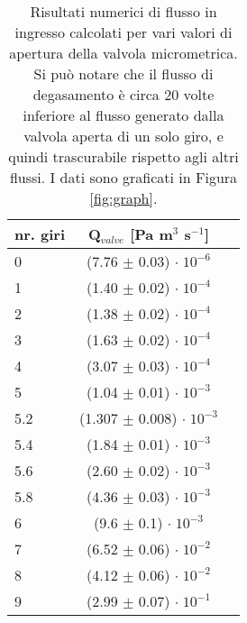 \begin{SCtable}[0.6][b!]
	\begin{tabular}{ l c c }
        \toprule
        nr. giri & Q$_{valve}$ [Pa m$^3$ s$^{-1}$] \\ 
        \midrule
        0   & (7.76 $\pm$ 0.03) $ \cdot \; 10^{-6}$  \\
        1   & (1.40 $\pm$ 0.02) $ \cdot \; 10^{-4}$  \\
        2   & (1.38 $\pm$ 0.02) $ \cdot \; 10^{-4}$  \\
        3   & (1.63 $\pm$ 0.02) $ \cdot \; 10^{-4}$  \\
        4   & (3.07 $\pm$ 0.03) $ \cdot \; 10^{-4}$  \\
        5   & (1.04 $\pm$ 0.01) $ \cdot \; 10^{-3}$  \\
        5.2 & (1.307 $\pm$ 0.008) $ \cdot \; 10^{-3}$ \\
        5.4 & (1.84 $\pm$ 0.01) $ \cdot \; 10^{-3}$  \\
        5.6 & (2.60 $\pm$ 0.02) $ \cdot \; 10^{-3}$  \\
        5.8 & (4.36 $\pm$ 0.03) $ \cdot \; 10^{-3}$  \\
        6   &  (9.6 $\pm$ 0.1)  $ \cdot \; 10^{-3}$ \\
        7   & (6.52 $\pm$ 0.06) $ \cdot \; 10^{-2}$  \\
        8   & (4.12 $\pm$ 0.06) $ \cdot \; 10^{-2}$  \\
        9   & (2.99 $\pm$ 0.07) $ \cdot \; 10^{-1}$  \\
    \bottomrule

	\end{tabular}
	\caption{Risultati numerici di flusso in ingresso calcolati per vari valori di apertura della valvola micrometrica. Si può notare che il flusso di degasamento è circa 20 volte inferiore
    al flusso generato dalla valvola aperta di un solo giro, e quindi trascurabile rispetto agli altri flussi. I dati sono graficati in Figura \ref{fig:graph}.}
    \label{tab:table}
\end{SCtable}
